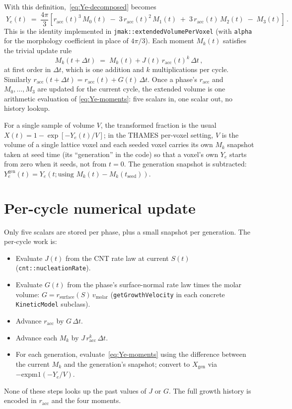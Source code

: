 \documentclass[11pt]{article}
\begin{document}
With this definition,~\eqref{eq:Ye-decomposed} becomes
\begin{equation}
\boxed{\;
Y_e(t) \;=\; \frac{4\pi}{3}\left[
     r_{\text{acc}}(t)^{3}\, M_{0}(t)
  \;-\; 3\, r_{\text{acc}}(t)^{2}\, M_{1}(t)
  \;+\; 3\, r_{\text{acc}}(t)\, M_{2}(t)
  \;-\; M_{3}(t)
\right]\,.
\;}
\label{eq:Ye-moments}
\end{equation}
This is the identity implemented in
\texttt{jmak::extendedVolumePerVoxel} (with \texttt{alpha} for the
morphology coefficient in place of $4\pi/3$).
Each moment $M_k(t)$ satisfies the trivial update rule
\begin{equation}
M_k(t + \Delta t) \;=\; M_k(t) + J(t)\, r_{\text{acc}}(t)^{k}\, \Delta t\,,
\label{eq:moment-update}
\end{equation}
at first order in $\Delta t$, which is one addition and $k$
multiplications per cycle.
Similarly $r_{\text{acc}}(t + \Delta t) = r_{\text{acc}}(t) + G(t)\, \Delta t$.
Once a phase's $r_{\text{acc}}$ and $M_0, \dots, M_3$ are updated for the
current cycle, the extended volume is one arithmetic evaluation of
\eqref{eq:Ye-moments}: five scalars in, one scalar out, no history
lookup.

For a single sample of volume $V$, the transformed fraction is the
usual $X(t) = 1 - \exp[-Y_e(t)/V]$; in the THAMES per-voxel setting,
$V$ is the volume of a single lattice voxel and each seeded voxel
carries its own $M_k$ snapshot taken at seed time (its ``generation''
in the code) so that a voxel's own $Y_e$ starts from zero when it
seeds, not from $t = 0$.
The generation snapshot is subtracted:
$Y_e^{\text{gen}}(t) = Y_e(t; \text{using } M_k(t) - M_k(t_{\text{seed}}))$.

\section{Per-cycle numerical update}

Only five scalars are stored per phase, plus a small snapshot per
generation. The per-cycle work is:
\begin{itemize}
\item Evaluate $J(t)$ from the CNT rate law at current $S(t)$
      (\texttt{cnt::nucleationRate}).
\item Evaluate $G(t)$ from the phase's surface-normal rate law times
      the molar volume: $G = r_{\text{surface}}(S)\, v_{\text{molar}}$
      (\texttt{getGrowthVelocity} in each concrete
      \texttt{KineticModel} subclass).
\item Advance $r_{\text{acc}}$ by $G\, \Delta t$.
\item Advance each $M_k$ by $J\, r_{\text{acc}}^{k}\, \Delta t$.
\item For each generation, evaluate~\eqref{eq:Ye-moments} using the
      difference between the current $M_k$ and the generation's
      snapshot; convert to $X_{\text{gen}}$ via $-\text{expm1}(-Y_e/V)$.
\end{itemize}
None of these steps looks up the past values of $J$ or $G$.
The full growth history is encoded in $r_{\text{acc}}$ and the four
moments.
\end{document}
